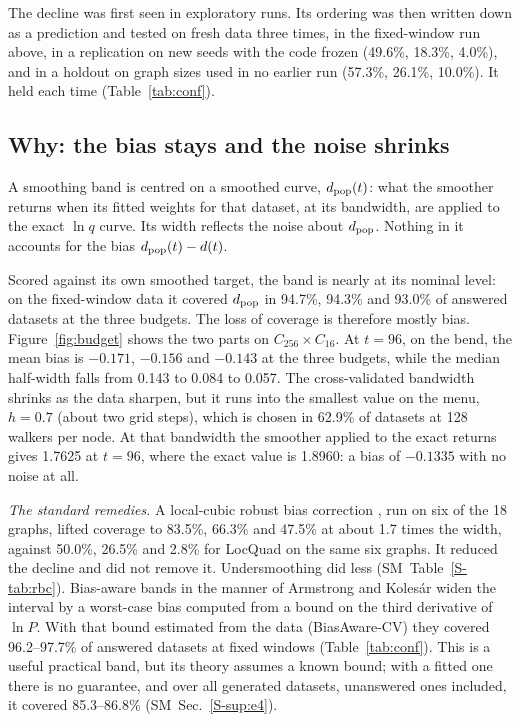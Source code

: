 \documentclass[aps,pre,twocolumn,superscriptaddress,nofootinbib,10pt]{revtex4-2}
\newcommand{\SM}{SM}
\newcommand{\nm}[1]{\textsf{#1}}
\newcommand{\LQ}{\nm{LocQuad}}
\newcommand{\BAC}{\nm{BiasAware-CV}}
\begin{document}
The decline was first seen in exploratory runs. Its ordering was then written down as a prediction and tested on fresh data three times, in the fixed-window run above, in a replication on new seeds with the code frozen (49.6\%, 18.3\%, 4.0\%), and in a holdout on graph sizes used in no earlier run (57.3\%, 26.1\%, 10.0\%). It held each time (Table~\ref{tab:conf}).

\subsection{Why: the bias stays and the noise shrinks}\label{sec:mech}
A smoothing band is centred on a smoothed curve, $d_{\rm pop}(t)$: what the smoother returns when its fitted weights for that dataset, at its bandwidth, are applied to the exact $\ln q$ curve. Its width reflects the noise about $d_{\rm pop}$. Nothing in it accounts for the bias $d_{\rm pop}(t)-d(t)$.

Scored against its own smoothed target, the band is nearly at its nominal level: on the fixed-window data it covered $d_{\rm pop}$ in 94.7\%, 94.3\% and 93.0\% of answered datasets at the three budgets. The loss of coverage is therefore mostly bias. Figure~\ref{fig:budget} shows the two parts on $C_{256}\times C_{16}$. At $t=96$, on the bend, the mean bias is $-0.171$, $-0.156$ and $-0.143$ at the three budgets, while the median half-width falls from 0.143 to 0.084 to 0.057. The cross-validated bandwidth shrinks as the data sharpen, but it runs into the smallest value on the menu, $h=0.7$ (about two grid steps), which is chosen in 62.9\% of datasets at 128 walkers per node. At that bandwidth the smoother applied to the exact returns gives 1.7625 at $t=96$, where the exact value is 1.8960: a bias of $-0.1335$ with no noise at all.

\emph{The standard remedies.} A local-cubic robust bias correction \cite{ccf2018,ccf2022}, run on six of the 18 graphs, lifted coverage to 83.5\%, 66.3\% and 47.5\% at about 1.7 times the width, against 50.0\%, 26.5\% and 2.8\% for \LQ{} on the same six graphs. It reduced the decline and did not remove it. Undersmoothing did less (\SM\ Table~\ref{S-tab:rbc}). Bias-aware bands in the manner of Armstrong and Koles\'ar \cite{ak2018,ak2020} widen the interval by a worst-case bias computed from a bound on the third derivative of $\ln P$. With that bound estimated from the data (\BAC{}) they covered 96.2--97.7\% of answered datasets at fixed windows (Table~\ref{tab:conf}). This is a useful practical band, but its theory assumes a known bound; with a fitted one there is no guarantee, and over all generated datasets, unanswered ones included, it covered 85.3--86.8\% (\SM\ Sec.~\ref{S-sup:e4}).
\end{document}
